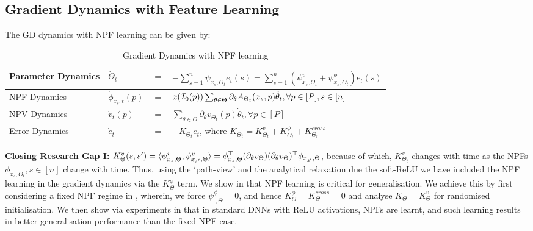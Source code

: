 \subsection{Gradient Dynamics with Feature Learning}
 The GD dynamics with NPF learning can be given by:
\FloatBarrier
\begin{table}[h]
\begin{tabular}{| l | lll |}\hline
Parameter Dynamics & $\dot{\Theta}_t$&$=$&$-\sum_{s=1}^n \psi_{x_s,\Theta_t}e_t(s)=\sum_{s=1}^n (\psi^v_{x_s,\Theta_t}+\psi^{\phi}_{x_s,\Theta_t})e_t(s)$\\\hline
NPF Dynamics& $\dot{\phi}_{x_s,t}(p)$&$=$&$x(\mathcal{I}_0(p))\sum_{\theta\in\Theta}\partial_{\theta}A_{\Theta_t}(x_s,p)\dot{\theta}_t,\forall p\in[P], s\in[n]$\\\hline
NPV Dynamics& $\dot{v}_t(p)$&$=$&$\sum_{\theta\in\Theta}\partial_{\theta}v_{\Theta_t}(p)\dot{\theta}_t,\forall p\in[P]$\\\hline
Error Dynamics& $\dot{e}_t$&$=$&$-K_{\Theta_t}e_t$, where $K_{\Theta_t}=K^v_{\Theta_t}+K^{\phi}_{\Theta_t}+K^{cross}_{\Theta_t}$\ \\\hline
\end{tabular}
\caption{Gradient Dynamics with NPF learning}
\label{tb:graddyna} 
\end{table}
\textbf{Closing Research Gap I:} $K^v_{\Theta}(s,s')=\langle \psi^v_{x_s,\Theta},\psi^v_{x_{s'},\Theta}\rangle=\phi^\top_{x_s,\Theta}(\partial_{\theta}v_{\Theta})(\partial_{\theta}v_{\Theta})^\top\phi_{x_{s'},\Theta}$, because of which, $K^v_{\Theta_t}$ changes with time as the NPFs  $\phi_{x_s,\Theta_t},s\in[n]$ change with time.  Thus, using the `path-view' and the analytical relaxation due the soft-ReLU we have included the NPF learning in the gradient dynamics via the $K^{\phi}_{\Theta}$ term. We show in  that NPF learning is critical for generalisation. We achieve this by first considering a fixed NPF regime in , wherein, we force $\psi^{\phi}_{\cdot,\Theta}=0$, and hence $K^{\phi}_{\Theta}=K^{cross}_{\Theta}=0$ and analyse $K_{\Theta}=K^v_{\Theta}$ for randomised initialisation. We then show via experiments in  that in standard DNNs with ReLU activations, NPFs are learnt, and such learning results in better generalisation performance than the fixed NPF case.

